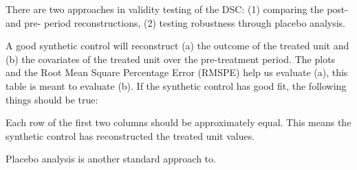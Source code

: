 
There are two approaches in validity testing of the DSC: (1) comparing the post- and pre- period reconstructions, (2) testing robustness through placebo analysis.

A good synthetic control will reconstruct (a) the outcome of the treated unit and (b) the covariates of the treated unit over the pre-treatment period. The plots and the Root Mean Square Percentage Error (RMSPE) help us evaluate (a), this table is meant to evaluate (b). If the synthetic control has good fit, the following things should be true:

Each row of the first two columns should be approximately equal. This means the synthetic control has reconstructed the treated unit values.

Placebo analysis is another standard approach to.
